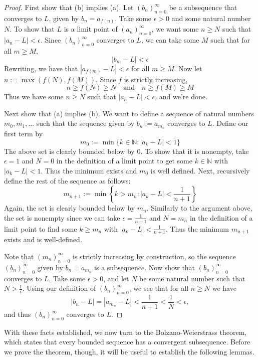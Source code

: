 \documentclass[11pt, oneside]{article}
\newcommand{\N}{\mathbb{N}}
\theoremstyle{definition}
\begin{document}
\begin{proof}
    First show that (b) implies (a). Let $(b_n)_{n=0}^\infty$ be a subsequence that converges to $L$, given by $b_n = a_{f(n)}$.
    Take some $\epsilon > 0$ and some natural number $N$. To show that $L$ is a limit point of $(a_n)_{n=0}^\infty$, we want some $n \geq N$ such that $|a_n - L| < \epsilon$.
    Since  $(b_n)_{n=0}^\infty$ converges to $L$, we can take some $M$ such that for all $m \geq M$,
    $$|b_m - L| < \epsilon$$
    Rewriting, we have that 
    $|a_{f(m)} - L| < \epsilon$
    for all $m \geq M$. Now let $n := \operatorname{max}(f(N), f(M))$. Since $f$ is strictly increasing,
    $$n \geq f(N) \geq N \quad \text{and} \quad n \geq f(M) \geq M$$
    Thus we have some $n \geq N$ such that $|a_n - L| < \epsilon$, and we're done.

    \vspace*{0.5em}
    Next show that (a) implies (b). We want
    to define a sequence of natural numbers
    $m_0, m_1, ...$ such that the sequence given by $b_n := a_{m_n}$ converges to $L$.
    Define our first term by
    $$m_0 := \min \{ k \in \N : |a_k - L| < 1 \}$$
    The above set is clearly bounded below by $0$. To show that it is nonempty, take $\epsilon = 1$ and $N = 0$ in the definition of a limit point to get some $k \in \N$ with $|a_k - L | < 1$. Thus the minimum exists and $m_0$ is well defined.
    Next, recursively define the rest of the sequence as follows:
    $$m_{n+1} := \min \left\{ k > m_n : |a_k - L| < \frac{1}{n + 1} \right\}$$
    Again, the set is clearly bounded below by $m_n$. Similarly to the argument above, the set is nonempty since we can take
    $\epsilon = \frac{1}{n+1}$ and $N = m_n$ in the definition of a limit point to find some $k \geq m_n$ with $|a_k - L| < \frac{1}{n+1}$. Thus the minimum $m_{n+1}$ exists and is well-defined.

    Note that $(m_n)_{n=0}^\infty$ is strictly increasing by construction, so the sequence $(b_n)_{n=0}^\infty$ given by $b_n = a_{m_n}$ is a subsequence.
    Now show that $(b_n)_{n=0}^\infty$ converges to $L$. Take some $\epsilon > 0$, and let $N$ be some natural number such that $N > \frac{1}{\epsilon}$.
    Using our definition of $(b_n)_{n=0}^\infty$, we see that for all $n \geq N$ we have
    $$|b_n - L| = |a_{m_n} - L| < \frac{1}{n + 1} < \frac{1}{N} < \epsilon,$$
    and thus $(b_n)_{n=0}^\infty$ converges to $L$.

\end{proof}

With these facts established, we now turn to the Bolzano-Weierstrass theorem, which states that every bounded sequence has a convergent subsequence.
Before we prove the theorem, though, it will be useful to establish the following lemmas.
\end{document}
